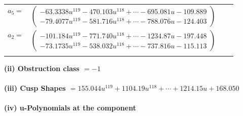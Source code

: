 \documentclass[1p]{elsarticle_modified}
\theoremstyle{definition}
\begin{document}
\begin{tabular}{m{7pt} m{180pt} m{7pt} m{180pt} }
\flushright $a_{5}=$&$\begin{pmatrix}-63.3338 u^{119}-470.103 u^{118}+\cdots-695.081 u-109.889\\-79.4077 u^{119}-581.716 u^{118}+\cdots-788.076 u-124.403\end{pmatrix}$ \\
\flushright $a_{2}=$&$\begin{pmatrix}-101.184 u^{119}-771.740 u^{118}+\cdots-1234.87 u-197.448\\-73.1735 u^{119}-538.032 u^{118}+\cdots-737.816 u-115.113\end{pmatrix}$\\&\end{tabular}
\flushleft \textbf{(ii) Obstruction class $= -1$}\\~\\
\flushleft \textbf{(iii) Cusp Shapes $= 155.044 u^{119}+1104.19 u^{118}+\cdots+1214.15 u+168.050$}\\~\\
\newpage\renewcommand{\arraystretch}{1}
\flushleft \textbf{(iv) u-Polynomials at the component}\newline \\
\end{document}
